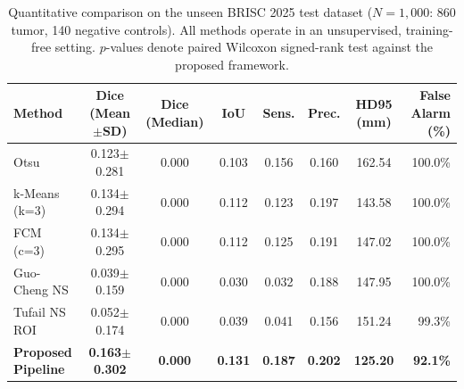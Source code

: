 \begin{table}[t]
\centering
\small
\caption{Quantitative comparison on the unseen BRISC 2025 test dataset ($N=1{,}000$: 860 tumor, 140 negative controls). All methods operate in an unsupervised, training-free setting. $p$-values denote paired Wilcoxon signed-rank test against the proposed framework.}\label{tab:test_benchmark}
\begin{tabular}{lccccccr}
\hline
Method & Dice (Mean$\pm$SD) & Dice (Median) & IoU & Sens. & Prec. & HD95 (mm) & False Alarm (\%) \\
\hline
Otsu & 0.123$\pm$0.281 & 0.000 & 0.103 & 0.156 & 0.160 & 162.54 & 100.0\% \\
k-Means (k=3) & 0.134$\pm$0.294 & 0.000 & 0.112 & 0.123 & 0.197 & 143.58 & 100.0\% \\
FCM (c=3) & 0.134$\pm$0.295 & 0.000 & 0.112 & 0.125 & 0.191 & 147.02 & 100.0\% \\
Guo-Cheng NS & 0.039$\pm$0.159 & 0.000 & 0.030 & 0.032 & 0.188 & 147.95 & 100.0\% \\
Tufail NS ROI & 0.052$\pm$0.174 & 0.000 & 0.039 & 0.041 & 0.156 & 151.24 & 99.3\% \\
\textbf{Proposed Pipeline} & \textbf{0.163$\pm$0.302} & \textbf{0.000} & \textbf{0.131} & \textbf{0.187} & \textbf{0.202} & \textbf{125.20} & \textbf{92.1\%} \\
\hline
\end{tabular}
\end{table}
